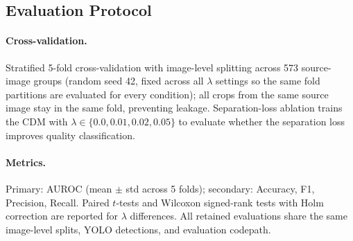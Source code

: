 \subsection{Evaluation Protocol}
\label{sec:exp:inkjet:evaluation}

\paragraph{Cross-validation.}
Stratified 5-fold cross-validation with image-level splitting across 573
source-image groups (random seed 42, fixed across all $\lambda$ settings
so the same fold partitions are evaluated for every condition); all
crops from the same source image stay in the same fold, preventing
leakage. Separation-loss ablation trains the CDM with
$\lambda \in \{0.0, 0.01, 0.02, 0.05\}$ to evaluate whether the
separation loss improves quality classification.

\enlargethispage{2\baselineskip}%
\paragraph{Metrics.}
Primary: AUROC (mean $\pm$ std across 5 folds); secondary: Accuracy, F1,
Precision, Recall. Paired $t$-tests and Wilcoxon signed-rank tests with
Holm correction are reported for $\lambda$ differences. All retained
evaluations share the same image-level splits, YOLO detections, and
evaluation codepath.
